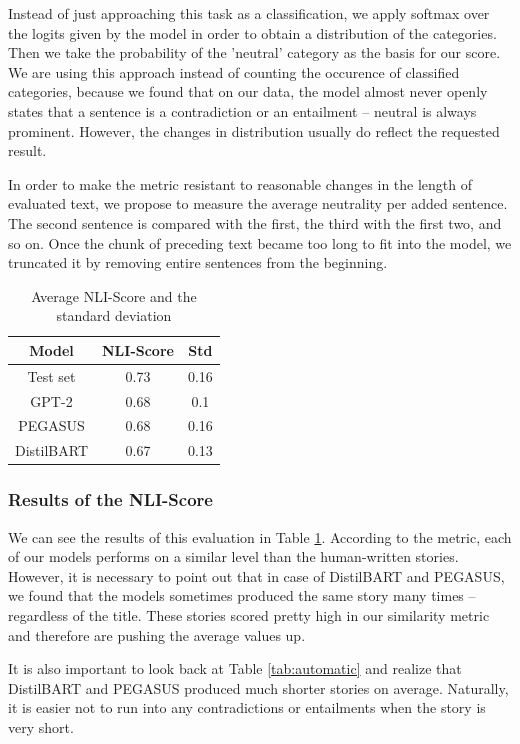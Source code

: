 \documentclass[11pt,a4paper]{article}
\begin{document}
Instead of just approaching this task as a classification, we apply softmax over the logits given by the model in order to obtain a distribution of the categories.
Then we take the probability of the 'neutral' category as the basis for our score.
We are using this approach instead of counting the occurence of classified categories, because we found that on our data, the model almost never openly states that a sentence is a contradiction or an entailment -- neutral is always prominent.
However, the changes in distribution usually do reflect the requested result.

In order to make the metric resistant to reasonable changes in the length of evaluated text, we propose to measure the average neutrality per added sentence.
The second sentence is compared with the first, the third with the first two, and so on.
Once the chunk of preceding text became too long to fit into the model, we truncated it by removing entire sentences from the beginning.

\begin{table}[]
    \centering
    \begin{tabular}{|c|c|c|}
    \hline
    \textbf{Model} & \textbf{NLI-Score} & \textbf{Std}  \\\hline
    Test set &  0.73  & 0.16  \\
    GPT-2 &  0.68  &  0.1 \\
    PEGASUS &  0.68  & 0.16 \\
    DistilBART & 0.67 & 0.13 \\
    \hline
    \end{tabular}
    \caption{Average NLI-Score and the standard deviation}
    \label{tab:nli}
\end{table}

\subsubsection{Results of the NLI-Score}


We can see the results of this evaluation in Table \ref{tab:nli}. According to the metric, each of our models performs on a similar level than the human-written stories. However, it is necessary to point out that in case of DistilBART and PEGASUS, we found that the models sometimes produced the same story many times -- regardless of the title. These stories scored pretty high in our similarity metric and therefore are pushing the average values up.

It is also important to look back at Table \ref{tab:automatic} and realize that DistilBART and PEGASUS produced much shorter stories on average. Naturally, it is easier not to run into any contradictions or entailments when the story is very short.
\end{document}

